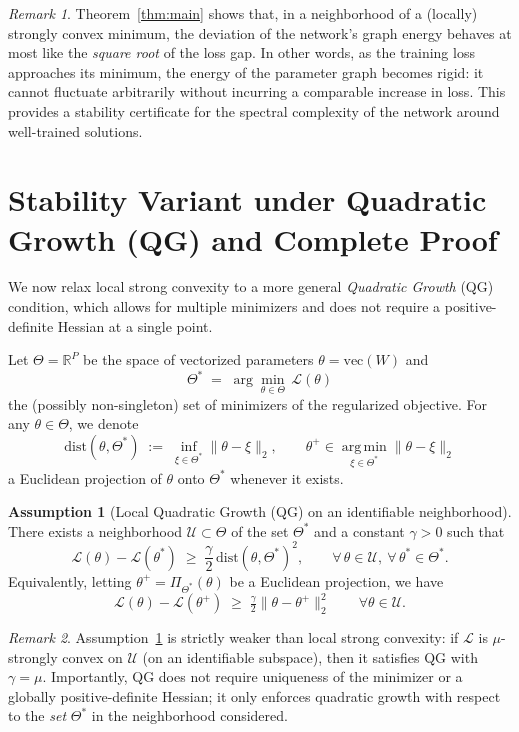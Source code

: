 \documentclass[a4paper,fleqn]{cas-sc}
\theoremstyle{remark}
\newtheorem{remark}{Remark}
\theoremstyle{definition}
\newtheorem{assumption}{Assumption}
\begin{document}
\begin{remark}
Theorem~\ref{thm:main} shows that, in a neighborhood of a (locally) strongly convex minimum, the deviation of the network's graph energy behaves at most like the \emph{square root} of the loss gap. In other words, as the training loss approaches its minimum, the energy of the parameter graph becomes rigid: it cannot fluctuate arbitrarily without incurring a comparable increase in loss. This provides a stability certificate for the spectral complexity of the network around well-trained solutions.
\end{remark}



\section{Stability Variant under Quadratic Growth (QG) and Complete Proof}
\label{sec:qg}

We now relax local strong convexity to a more general \emph{Quadratic Growth} (QG) condition, which allows for multiple minimizers and does not require a positive-definite Hessian at a single point.

Let $\Theta=\mathbb{R}^P$ be the space of vectorized parameters $\theta=\mathrm{vec}(W)$ and
\[
\Theta^* \;=\; \arg\min_{\theta\in\Theta}\,\mathcal{L}(\theta)
\]
the (possibly non-singleton) set of minimizers of the regularized objective. For any $\theta\in\Theta$, we denote
\[
\mathrm{dist}(\theta,\Theta^*) \;:=\; \inf_{\xi\in\Theta^*}\|\theta-\xi\|_2,
\qquad
\theta^+ \in \operatorname*{arg\,min}_{\xi\in\Theta^*}\|\theta-\xi\|_2
\]
a Euclidean projection of $\theta$ onto $\Theta^*$ whenever it exists.

\begin{assumption}[Local Quadratic Growth (QG) on an identifiable neighborhood]\label{hyp:QG}
There exists a neighborhood $\mathcal{U}\subset\Theta$ of the set $\Theta^*$ and a constant $\gamma>0$ such that
\[
\mathcal{L}(\theta)-\mathcal{L}(\theta^*) \;\ge\; \frac{\gamma}{2}\,\mathrm{dist}(\theta,\Theta^*)^2,
\qquad \forall\,\theta\in\mathcal{U},\ \forall\,\theta^*\in\Theta^*.
\]
Equivalently, letting $\theta^+=\Pi_{\Theta^*}(\theta)$ be a Euclidean projection, we have
\[
\mathcal{L}(\theta)-\mathcal{L}(\theta^+) \;\ge\; \tfrac{\gamma}{2}\|\theta-\theta^+\|_2^2
\qquad \forall \theta\in\mathcal{U}.
\]
\end{assumption}

\begin{remark}
Assumption~\ref{hyp:QG} is strictly weaker than local strong convexity: if $\mathcal{L}$ is $\mu$-strongly convex on $\mathcal{U}$ (on an identifiable subspace), then it satisfies QG with $\gamma=\mu$. Importantly, QG does not require uniqueness of the minimizer or a globally positive-definite Hessian; it only enforces quadratic growth with respect to the \emph{set} $\Theta^*$ in the neighborhood considered.
\end{remark}
\end{document}
